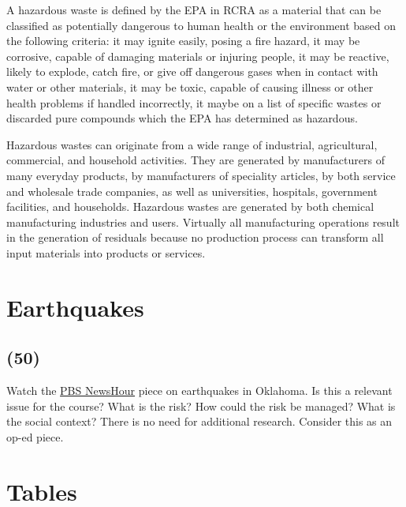 \documentclass[11pt,a4paper]{article}
\makeatletter
\renewcommand\listoftables{%
    \@starttoc{lot}%
}
\makeatother
\begin{document}
A hazardous waste is defined by the EPA in RCRA as a material that can be classified as potentially dangerous to human health or the environment based on the following criteria: it may ignite easily, posing a fire hazard, it may be corrosive, capable of damaging materials or injuring people, it may be reactive, likely to explode, catch fire, or give off dangerous gases when in contact with water or other materials, it may be toxic, capable of causing illness or other health problems if handled incorrectly, it maybe on a list of specific wastes or discarded pure compounds which the EPA has determined as hazardous.

Hazardous wastes can originate from a wide range of industrial, agricultural, commercial, and household activities. They are generated by manufacturers of many everyday products, by manufacturers of speciality articles, by both service and wholesale trade companies, as well as universities, hospitals, government facilities, and households. Hazardous wastes are generated by both chemical manufacturing industries and users. Virtually all manufacturing operations result in the generation of residuals because no production process can transform all input materials into products or services.




\newpage
        
\section{Earthquakes}
\subsection*{(50)}
Watch the \href{https://youtu.be/csbdeOfhKTM}{PBS NewsHour} piece on earthquakes in Oklahoma. Is this a relevant issue for the course? What is the risk? How could the risk be managed? What is the social context? There is no need for additional research. Consider this as an op-ed piece.

        
        
        
        
\newpage

\section*{Tables}

{%
\let\oldnumberline\numberline%
\renewcommand{\numberline}{\tablename~\oldnumberline}%
\listoftables%
}
\end{document}
